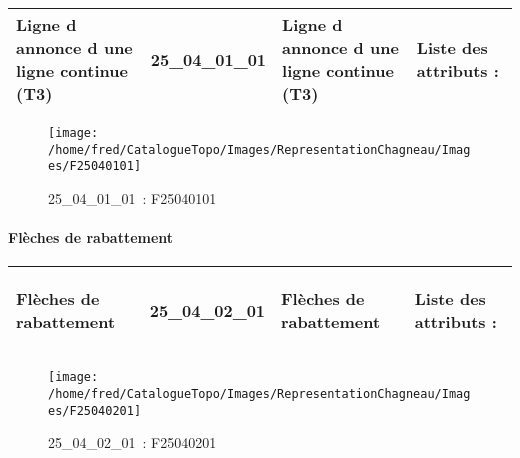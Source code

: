 \documentclass[12pt,titlepage,oneside]{book}
\begin{document}
\renewcommand{\arraystretch}{1.2}
\begin{supertabular}{|p{10cm}|c|p{13cm}|p{12cm}|}
 Ligne d annonce d une ligne continue (T3) & 25\_04\_01\_01 & Ligne d annonce d une ligne continue (T3) & Liste des attributs :
\begin{enumerate}
\end{enumerate}
\\
\hline
\end{supertabular}
\begin{figure}[h!]
  \hfill         %
  \begin{minipage}[t]{3cm}
    \begin{center}
      \texttt{[image: /home/fred/CatalogueTopo/Images/RepresentationChagneau/Images/F25040101]}
      \caption[~25\_04\_01\_01]{\small{25\_04\_01\_01~:} \tiny{F25040101}}\label{F25040101}
    \end{center}
  \end{minipage}
\end{figure}


\paragraph{Flèches de rabattement}
\noindent
\vspace{\baselineskip}

\renewcommand{\arraystretch}{1.2}
\begin{supertabular}{|p{10cm}|c|p{13cm}|p{12cm}|}
 Flèches de rabattement & 25\_04\_02\_01 & Flèches de rabattement & Liste des attributs :
\begin{enumerate}
\end{enumerate}
\\
\hline
\end{supertabular}
\begin{figure}[h!]
  \hfill         %
  \begin{minipage}[t]{3cm}
    \begin{center}
      \texttt{[image: /home/fred/CatalogueTopo/Images/RepresentationChagneau/Images/F25040201]}
      \caption[~25\_04\_02\_01]{\small{25\_04\_02\_01~:} \tiny{F25040201}}\label{F25040201}
    \end{center}
  \end{minipage}
\end{figure}
\end{document}
